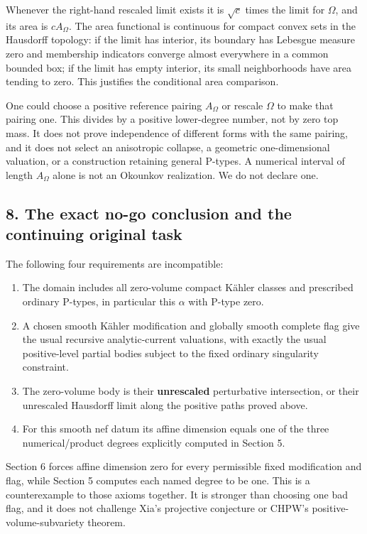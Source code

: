 \documentclass[11pt]{article}
\begin{document}
Whenever the right-\allowbreak{}hand rescaled limit exists it is $\sqrt c$ times the limit for $\Omega$, and its area is $cA_\Omega$. The area functional is continuous for compact convex sets in the Hausdorff topology: if the limit has interior, its boundary has Lebesgue measure zero and membership indicators converge almost everywhere in a common bounded box; if the limit has empty interior, its small neighborhoods have area tending to zero. This justifies the conditional area comparison.

One could choose a positive reference pairing $A_\Omega$ or rescale $\Omega$ to make that pairing one. This divides by a positive lower-\allowbreak{}degree number, not by zero top mass. It does not prove independence of different forms with the same pairing, and it does not select an anisotropic collapse, a geometric one-\allowbreak{}dimensional valuation, or a construction retaining general P-\allowbreak{}types. A numerical interval of length $A_\Omega$ alone is not an Okounkov realization. We do not declare one.

\subsection{8. The exact no-\allowbreak{}go conclusion and the continuing original task}

The following four requirements are incompatible:

\begin{enumerate}
\item[1.] The domain includes all zero-\allowbreak{}volume compact Kähler classes and prescribed ordinary P-\allowbreak{}types, in particular this $\alpha$ with P-\allowbreak{}type zero.
\item[2.] A chosen smooth Kähler modification and globally smooth complete flag give the usual recursive analytic-\allowbreak{}current valuations, with exactly the usual positive-\allowbreak{}level partial bodies subject to the fixed ordinary singularity constraint.
\item[3.] The zero-\allowbreak{}volume body is their \textbf{unrescaled} perturbative intersection, or their unrescaled Hausdorff limit along the positive paths proved above.
\item[4.] For this smooth nef datum its affine dimension equals one of the three numerical/\allowbreak{}product degrees explicitly computed in Section 5.

\end{enumerate}
Section 6 forces affine dimension zero for every permissible fixed modification and flag, while Section 5 computes each named degree to be one. This is a counterexample to those axioms together. It is stronger than choosing one bad flag, and it does not challenge Xia's projective conjecture or CHPW's positive-\allowbreak{}volume-\allowbreak{}subvariety theorem.
\end{document}
